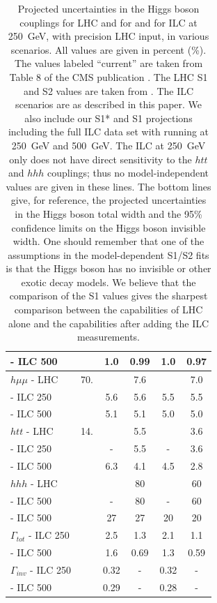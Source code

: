 \begin{table}[!htbp]
\begin{center}
\begin{tabular}{lccccc}
 \phantom{$h\gamma\gamma$} - ILC 500  &      &   1.0  &  0.99 &   1.0  &  0.97\\ 
\hline 
$h\mu\mu$ - LHC  &   70.        &        &     7.6  &        & 7.0 \\ 
\phantom{$h\mu\mu$} - ILC 250 &      &  5.6  &  5.6  &  5.5  &  5.5 \\ 
\phantom{$h\mu\mu$} - ILC 500 &      &  5.1  &  5.1  &  5.0  & 5.0\\ 
     \hline 
$htt$ - LHC  &   14.        &        &           5.5   &        &  3.6
  \\  
  \phantom{$htt$} - ILC 250  &        &   -     &     5.5    &  -   & 3.6
\\ 
\phantom{$htt$} - ILC 500  &        &    6.3    &     4.1     &    4.5   & 2.8
\\ 
\hline 
$hhh$ - LHC  &         &        &  80  &        &     60
  \\  
 \phantom{$hhh$} - ILC 500  &        &  -    &    80     &  -   & 60
\\ 
 \phantom{$hhh$} - ILC 500  &        &    27  &    27      &   20  & 20
\\ 
\hline \hline
$\Gamma_{tot}$ - ILC 250 &  &   2.5   &   1.3    &    2.1   & 1.1   \\ 
\phantom{$\Gamma_{tot}$} - ILC 500 & & 1.6 & 0.69 & 1.3  &  0.59  \\  \hline
$\Gamma_{inv}$ - ILC 250 &  &   0.32   &    -     &   0.32   &   -  \\ 
\phantom{$\Gamma_{inv}$} - ILC 500 & & 0.29 &  - & 0.28  & - \\  \hline
\end{tabular}
\end{center}
\caption{ \label{tab:ILCLHC}   Projected uncertainties in the Higgs
  boson couplings for LHC and for   and for ILC at 250~GeV, with
  precision LHC input, in various scenarios.   All values
  are given in percent (\%). The values labeled ``current'' are taken
  from Table 8 of the CMS publication \cite{Sirunyan:2018koj}.   The LHC S1 and
  S2 values are taken from \cite{YR}. The ILC scenarios are as
  described in this paper.  We also include our S1* and S1 projections
including the full ILC data set  with running at 250~GeV and 500~GeV. The ILC at 250~GeV only does not have direct sensitivity to the $htt$ and $hhh$ couplings; thus no  model-independent  values are given in these lines. The
  bottom lines give, for reference, the projected uncertainties in the
  Higgs boson total width and the 95\% confidence limits on the Higgs boson invisible width.  One should remember that one of the assumptions in the model-dependent S1/S2 fits is that the Higgs boson has no invisible or other exotic decay models.  We believe that the comparison of the S1
  values  gives the sharpest comparison between the capabilities of LHC
  alone and the capabilities after adding the ILC measurements. }
\end{table}

